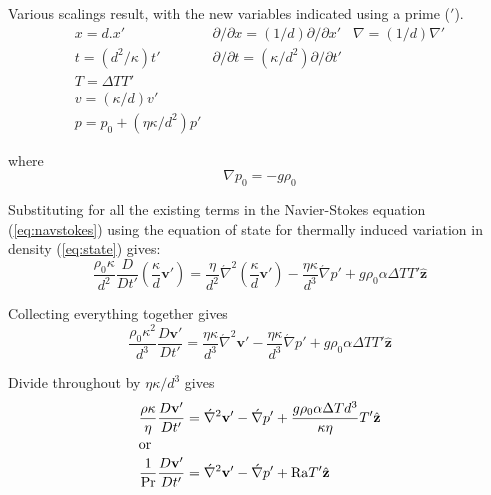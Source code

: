 \documentclass[10pt]{article}
\begin{document}
	Various scalings result, with the new variables indicated using a
	prime ($'$).
		\begin{equation}
			\begin{array}{llll}
				x = d.x' & \partial / \partial x = 	(1/d) \partial / \partial x' & \nabla = (1/d) \nabla '  \\
				t = (d^2/\kappa) t'  &  \partial / \partial t = (\kappa/d^2) \partial / \partial t' & \\
				T = \Delta T T' & & \\
				v = (\kappa / d) v' && \\
				p= p_0 + (\eta \kappa / d^2) p'
			\end{array}
		\end{equation}
	
	where 
		\begin{equation}
			\nabla p_0 = - g \rho_0 
		\end{equation}
	
	Substituting for all the existing terms in the Navier-Stokes equation (\ref{eq:navstokes}) 
	using the equation of state for thermally induced variation in density (\ref{eq:state}) gives:
		\begin{equation}
			\frac{\rho_0 \kappa}{d^2} \frac{D}{Dt'} \left( \frac{\kappa}{d} \mathbf{v}' \right) =
				\frac{\eta}{d^2} \acute{\nabla}^2 \left( \frac{\kappa}{d} \mathbf{v}' \right)
				- \frac{\eta \kappa}{d^3}  \acute{\nabla} p' + g \rho_0 \alpha \Delta T T' \hat{\mathbf{z}}
		\end{equation}
	
	Collecting everything together gives 
		\begin{equation}
			\frac{\rho_0 \kappa^2}{d^3} \frac{D\mathbf{v}'}{Dt'}  =
				\frac{\eta \kappa}{d^3} \acute{\nabla}^2  \mathbf{v}' 
				- \frac{\eta \kappa}{d^3}  \acute{\nabla} p' + g \rho_0 \alpha \Delta T T' \hat{\mathbf{z}}
		\end{equation}
	
	Divide throughout by $\eta \kappa / d^3$ gives
			\begin{align}
				\frac{\rho \kappa}{\eta} \frac{D\mathbf{v}'}{Dt'}  & =
					 \acute{\nabla}^2  \mathbf{v}'  -  \acute{\nabla} p' + 
					 \frac{g \rho_0 \alpha \Delta T d^3}{\kappa \eta} T' \hat{\mathbf{z}} \nonumber \\
			\intertext{or}	 
				\frac{1}{{\rm Pr}} \frac{D\mathbf{v}'}{Dt'} & =
					\acute{\nabla}^2  \mathbf{v}'  -  \acute{\nabla} p' + {\rm Ra} T' \hat{\mathbf{z}}
			\end{align}
	
\end{document}
